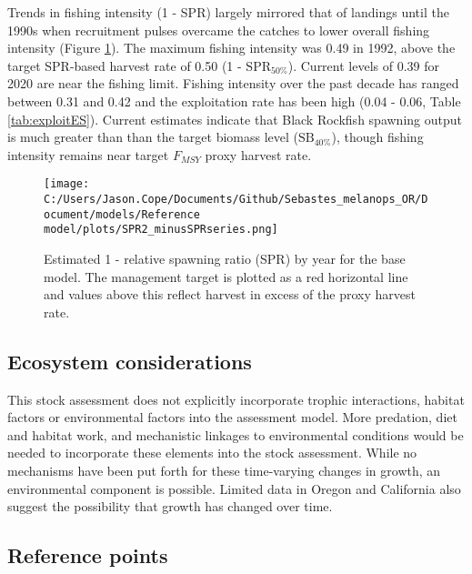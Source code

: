 \documentclass[11pt,
  english,
  letterpaper,
]{article}
\begin{document}
Trends in fishing intensity (1 - SPR) largely mirrored that of landings until the 1990s when recruitment pulses overcame the catches to lower overall fishing intensity (Figure \ref{fig:es-1-spr}). The maximum fishing intensity was 0.49 in 1992, above the target SPR-based harvest rate of 0.50 (1 - \(\text{SPR}_{50\%}\)). Current levels of 0.39 for 2020 are near the fishing limit. Fishing intensity over the past decade has ranged between 0.31 and 0.42 and the exploitation rate has been high (0.04 - 0.06, Table \ref{tab:exploitES}). Current estimates indicate that Black Rockfish spawning output is much greater than than the target biomass level (\(\text{SB}_{40\%}\)), though fishing intensity remains near target \(F_{MSY}\) proxy harvest rate.



\begin{figure}
\centering
\texttt{[image: C:/Users/Jason.Cope/Documents/Github/Sebastes\_melanops\_OR/Document/models/Reference model/plots/SPR2\_minusSPRseries.png]}
\caption{Estimated 1 - relative spawning ratio (SPR) by year for the base model. The management target is plotted as a red horizontal line and values above this reflect harvest in excess of the proxy harvest rate.\label{fig:es-1-spr}}
\end{figure}

\clearpage

\hypertarget{ecosystem-considerations}{%
\subsection*{Ecosystem considerations}\label{ecosystem-considerations}}

This stock assessment does not explicitly incorporate trophic interactions, habitat factors or environmental factors into the assessment model. More predation, diet and habitat work, and mechanistic linkages to environmental conditions would be needed to incorporate these elements into the stock assessment. While no mechanisms have been put forth for these time-varying changes in growth, an environmental component is possible. Limited data in Oregon and California also suggest the possibility that growth has changed over time.

\hypertarget{reference-points}{%
\subsection*{Reference points}\label{reference-points}}
\end{document}
